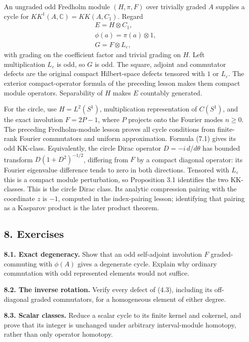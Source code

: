\documentclass[
  11pt,
]{article}
\begin{document}
An ungraded odd Fredholm module \((H,\pi,F)\) over trivially graded
\(A\) supplies a cycle for \(KK^1(A,\mathbb C)=KK(A,C_1)\). Regard \[
\begin{gathered}
E=H\otimes C_1,\\
\phi(a)=\pi(a)\otimes1,\\
G=F\otimes L_\varepsilon,
\end{gathered}
\tag{7.1}
\] with grading on the coefficient factor and trivial grading on \(H\).
Left multiplication \(L_\varepsilon\) is odd, so \(G\) is odd. The
square, adjoint and commutator defects are the original compact
Hilbert-space defects tensored with \(1\) or \(L_\varepsilon\). The
exterior compact-operator formula of the preceding lesson makes them
compact module operators. Separability of \(H\) makes \(E\) countably
generated.

For the circle, use \(H=L^2(S^1)\), multiplication representation of
\(C(S^1)\), and the exact involution \(F=2P-1\), where \(P\) projects
onto the Fourier modes \(n\geq0\). The preceding Fredholm-module lesson
proves all cycle conditions from finite-rank Fourier commutators and
uniform approximation. Formula (7.1) gives its odd KK-class.
Equivalently, the circle Dirac operator \(D=-i\,d/d\theta\) has bounded
transform \(D(1+D^2)^{-1/2}\), differing from \(F\) by a compact
diagonal operator: its Fourier eigenvalue difference tends to zero in
both directions. Tensored with \(L_\varepsilon\) this is a compact
module perturbation, so Proposition 3.1 identifies the two KK-classes.
This is the circle Dirac class. Its analytic compression pairing with
the coordinate \(z\) is \(-1\), computed in the index-pairing lesson;
identifying that pairing as a Kasparov product is the later product
theorem.

\subsection{8. Exercises}\label{exercises}

\textbf{8.1. Exact degeneracy.} Show that an odd self-adjoint involution
\(F\) graded-commuting with \(\phi(A)\) gives a degenerate cycle.
Explain why ordinary commutation with odd represented elements would not
suffice.

\textbf{8.2. The inverse rotation.} Verify every defect of (4.3),
including its off-diagonal graded commutators, for a homogeneous element
of either degree.

\textbf{8.3. Scalar classes.} Reduce a scalar cycle to its finite kernel
and cokernel, and prove that its integer is unchanged under arbitrary
interval-module homotopy, rather than only operator homotopy.
\end{document}
